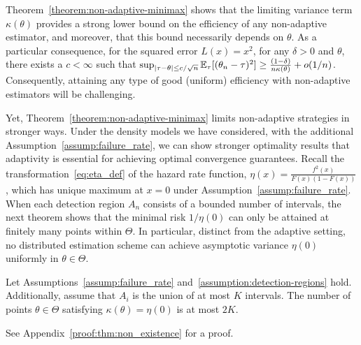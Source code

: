 Theorem~\ref{theorem:non-adaptive-minimax} shows that the limiting variance
term $\kappa(\theta)$ provides a strong lower bound on the efficiency of any
non-adaptive estimator, and moreover, that this bound necessarily depends
on $\theta$. As a
particular consequence, for the squared error $L(x) = x^2$, for any $\delta
> 0$ and $\theta$, there exists a $c < \infty$ such that $\sup_{|\tau -
  \theta| \le c / \sqrt{n}} \mathbb{E}_\tau[(\theta_n - \tau)^2] \ge \frac{(1 -
  \delta)}{n \kappa(\theta)} + o(1/n)$. Consequently, attaining any type of good (uniform)
efficiency with non-adaptive estimators will be challenging. 

Yet, Theorem~\ref{theorem:non-adaptive-minimax}
limits non-adaptive strategies in stronger ways.
Under the density models we have considered, with the additional
Assumption~\ref{assump:failure_rate}, we can show stronger
optimality results that adaptivity is essential for achieving
optimal convergence guarantees.
Recall the transformation~\eqref{eq:eta_def} of the
hazard rate function, $\eta(x) = \frac{f^2(x)}{F(x)(1 - F(x))}$, which
has unique maximum at $x = 0$ under Assumption~\ref{assump:failure_rate}.
When each detection region $A_n$ consists of a bounded number
of intervals, the next theorem shows that
the minimal risk $1/\eta(0)$ can
only be attained at finitely many points within $\Theta$.
In particular, distinct from the adaptive setting, no distributed
estimation scheme can achieve asymptotic variance $\eta(0)$
uniformly in $\theta \in \Theta$.

\begin{thm} \label{thm:non_existence}
  Let Assumptions~\ref{assump:failure_rate}
  and~\ref{assumption:detection-regions} hold.
  Additionally, assume that $A_i$ is the union of at most $K$
  intervals. The number of points $\theta \in \Theta$ satisfying
  $\kappa(\theta) = \eta(0)$ is at most $2K$.
\end{thm}
\noindent
See Appendix~\ref{proof:thm:non_existence} for a proof.




